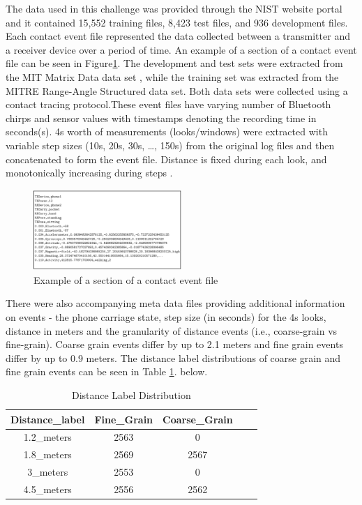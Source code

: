 \documentclass[conference]{IEEEtran}
\begin{document}
The data used in this challenge was provided through the NIST website portal \cite{b5} and it contained 15,552 training files, 8,423 test files, and 936 development files. Each contact event file represented the data collected between a transmitter and a receiver device over a  period of time. An example of a section of a contact event file can be seen in Figure\ref{fig:fig_1}. The development and test sets were extracted from the MIT Matrix Data data set \cite{b6}, while the training set was extracted from the MITRE Range-Angle Structured data set\cite{b7}. Both data sets were collected using a contact tracing protocol\cite{b8}.These event files have varying number of Bluetooth chirps and sensor values with timestamps denoting the recording time in seconds(s). 4s worth of measurements (looks/windows) were extracted  with variable step sizes (10s, 20s, 30s, …, 150s) from the original log files and then concatenated to form the event file. Distance is fixed during each look, and monotonically increasing during steps \cite{b9}.\\ 
\begin{figure}[H]
\centering
\includegraphics[width=0.5\textwidth]{img/data.png}
\caption[]{Example of a section of a contact event file}
\label{fig:fig_1}
\end{figure}
There were also accompanying meta data files providing additional information on events - the phone carriage state, step size (in seconds) for the 4s looks, distance in meters and the granularity of distance events (i.e., coarse-grain vs fine-grain).
Coarse  grain  events  differ  by  up  to  2.1  meters and fine  grain events differ by up to 0.9 meters.\cite{b1}  The distance label distributions of coarse grain and fine grain events can be seen in Table \ref{table:distance_label_dist}.\cite{b2} below.
\begin{table}[h!]
\begin{center}
\begin{tabular}{ c c c c c }
 Distance\_label & Fine\_Grain & Coarse\_Grain  \\ \hline
 1.2\_meters & 2563 & 0 \\ 
 1.8\_meters & 2569 & 2567  \\  
 3\_meters & 2553 & 0  \\
 4.5\_meters & 2556 & 2562 
\end{tabular}
\caption{Distance Label Distribution}
\label{table:distance_label_dist}
\end{center}
\end{table} 
\end{document}
